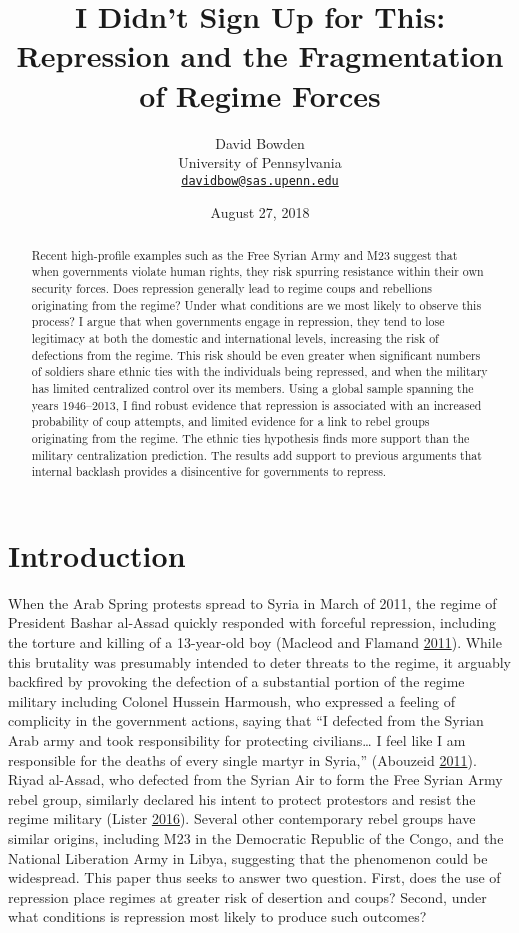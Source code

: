 \documentclass[12pt,]{article}
\title{I Didn't Sign Up for This: Repression and the Fragmentation of Regime
Forces}
\author{David Bowden\\
University of Pennsylvania\\
\href{mailto:davidbow@sas.upenn.edu}{\nolinkurl{davidbow@sas.upenn.edu}}}
\date{August 27, 2018}
\theoremstyle{definition}
\theoremstyle{definition}
\theoremstyle{definition}
\theoremstyle{remark}
\begin{document}
\maketitle
\begin{abstract}
Recent high-profile examples such as the Free Syrian Army and M23
suggest that when governments violate human rights, they risk spurring
resistance within their own security forces. Does repression generally
lead to regime coups and rebellions originating from the regime? Under
what conditions are we most likely to observe this process? I argue that
when governments engage in repression, they tend to lose legitimacy at
both the domestic and international levels, increasing the risk of
defections from the regime. This risk should be even greater when
significant numbers of soldiers share ethnic ties with the individuals
being repressed, and when the military has limited centralized control
over its members. Using a global sample spanning the years 1946--2013, I
find robust evidence that repression is associated with an increased
probability of coup attempts, and limited evidence for a link to rebel
groups originating from the regime. The ethnic ties hypothesis finds
more support than the military centralization prediction. The results
add support to previous arguments that internal backlash provides a
disincentive for governments to repress.
\end{abstract}

\doublespacing

\setlength{\parindent}{1cm}

\hypertarget{introduction}{%
\section{Introduction}\label{introduction}}

When the Arab Spring protests spread to Syria in March of 2011, the
regime of President Bashar al-Assad quickly responded with forceful
repression, including the torture and killing of a 13-year-old boy
(Macleod and Flamand \protect\hyperlink{ref-Macleod2011}{2011}). While
this brutality was presumably intended to deter threats to the regime,
it arguably backfired by provoking the defection of a substantial
portion of the regime military including Colonel Hussein Harmoush, who
expressed a feeling of complicity in the government actions, saying that
``I defected from the Syrian Arab army and took responsibility for
protecting civilians\ldots{} I feel like I am responsible for the deaths
of every single martyr in Syria,'' (Abouzeid
\protect\hyperlink{ref-Abouzeid2011}{2011}). Riyad al-Assad, who
defected from the Syrian Air to form the Free Syrian Army rebel group,
similarly declared his intent to protect protestors and resist the
regime military (Lister \protect\hyperlink{ref-Lister2016}{2016}).
Several other contemporary rebel groups have similar origins, including
M23 in the Democratic Republic of the Congo, and the National Liberation
Army in Libya, suggesting that the phenomenon could be widespread. This
paper thus seeks to answer two question. First, does the use of
repression place regimes at greater risk of desertion and coups? Second,
under what conditions is repression most likely to produce such
outcomes?
\end{document}
